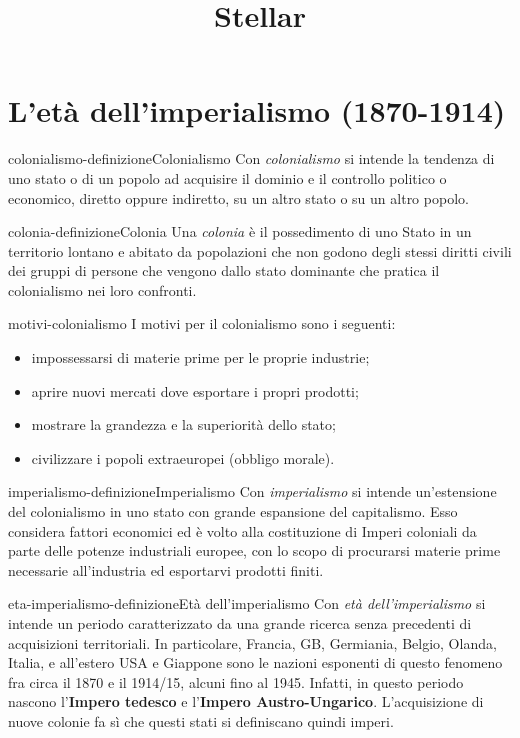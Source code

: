 \documentclass[preview]{standalone}
\begin{document}
\title{Stellar}
\genpage

\section{L'età dell'imperialismo (1870-1914)} %

\begin{snippetdefinition}{colonialismo-definizione}{Colonialismo}
    Con \textit{colonialismo} si intende la tendenza di uno stato o di un popolo ad acquisire
    il dominio e il controllo politico
    o economico, diretto oppure indiretto, su un altro stato o su un altro popolo.
\end{snippetdefinition}

\begin{snippetdefinition}{colonia-definizione}{Colonia}
    Una \textit{colonia} è il possedimento di uno Stato in un territorio
    lontano e abitato da popolazioni che non godono
    degli stessi diritti civili dei gruppi di persone che vengono dallo stato dominante
    che pratica il colonialismo nei loro confronti.
\end{snippetdefinition}

\begin{snippet}{motivi-colonialismo}
    I motivi per il colonialismo sono i seguenti:
    \begin{itemize}
        \item impossessarsi di materie prime per le proprie industrie;
        \item aprire nuovi mercati dove esportare i propri prodotti;
        \item mostrare la grandezza e la superiorità dello stato;
        \item civilizzare i popoli extraeuropei (obbligo morale).
    \end{itemize}
\end{snippet}

\begin{snippetdefinition}{imperialismo-definizione}{Imperialismo}
    Con \textit{imperialismo} si intende un'estensione del colonialismo
    in uno stato con grande espansione del capitalismo.
    Esso considera fattori economici ed è volto alla costituzione di Imperi coloniali da parte
    delle potenze industriali europee, con lo scopo di procurarsi materie prime necessarie all'industria ed esportarvi prodotti finiti.
\end{snippetdefinition}

\begin{snippetdefinition}{eta-imperialismo-definizione}{Età dell'imperialismo}
    Con \textit{età dell'imperialismo} si intende un periodo
    caratterizzato da una grande ricerca senza precedenti di acquisizioni territoriali.
    In particolare, Francia, GB, Germiania, Belgio, Olanda, Italia, e all'estero
    USA e Giappone sono le nazioni esponenti di questo fenomeno
    fra circa il 1870 e il 1914/15, alcuni fino al 1945.
    Infatti, in questo periodo nascono l'\textbf{Impero tedesco} e l'\textbf{Impero Austro-Ungarico}.
    L'acquisizione di nuove colonie fa sì che questi stati si definiscano quindi imperi.
\end{snippetdefinition}
\end{document}
